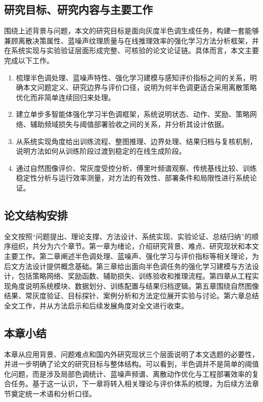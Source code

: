 \documentclass[thesis]{../zstucs-graduation-project}
\begin{document}
\subsection{研究目标、研究内容与主要工作}
围绕上述背景与问题，本文的研究目标是面向灰度半色调生成任务，构建一套能够兼顾离散决策属性、蓝噪声纹理质量与在线推理效率的强化学习方法分析框架，并在系统实现与实验验证层面形成完整、可核验的论文论证链。具体而言，本文主要完成以下工作。

\begin{enumerate}
    \item 梳理半色调处理、蓝噪声特性、强化学习建模与感知评价指标之间的关系，明确本文问题定义、研究边界与评价口径，说明为何半色调更适合采用离散策略优化而非简单连续回归来处理。
    \item 建立单步多智能体强化学习半色调框架，系统说明状态、动作、奖励、策略网络、辅助频域损失与阈值部署验收之间的关系，并分析其设计依据。
    \item 从系统实现角度给出训练流程、整图推理、边界处理、结果归档与复核机制，说明方法如何从训练阶段过渡到稳定的在线生成阶段。
    \item 通过自然图像评价、常灰度受控分析、傅里叶频谱观察、传统基线比较、训练稳定性分析与运行效率测量，对方法的有效性、部署条件和局限性进行系统论证。
\end{enumerate}

\subsection{论文结构安排}
全文按照“问题提出、理论支撑、方法设计、系统实现、实验论证、总结归纳”的顺序组织，共分为六个章节。第一章为绪论，介绍研究背景、难点、研究现状和本文主要工作。第二章阐述半色调处理、蓝噪声、强化学习与评价指标等相关理论，为后文方法设计提供概念基础。第三章给出面向半色调任务的强化学习建模与方法设计，包括策略网络、奖励函数、辅助损失、训练验收和推理流程。第四章从工程实现角度说明系统模块、数据划分、训练配置与结果归档逻辑。第五章围绕自然图像结果、常灰度验证、目标探针、案例分析和方法定位展开实验与讨论。第六章总结全文工作，并从方法启示和后续发展角度对全文进行收束。

\subsection{本章小结}
本章从应用背景、问题难点和国内外研究现状三个层面说明了本文选题的必要性，并进一步明确了论文的研究目标与整体结构。可以看到，半色调并不是简单的阈值化问题，而是涉及局部色调统计、蓝噪声频谱、离散动作优化与工程部署效率的复合任务。基于这一认识，下一章将转入相关理论与评价体系的梳理，为后续方法章节奠定统一术语和分析口径。
\end{document}
